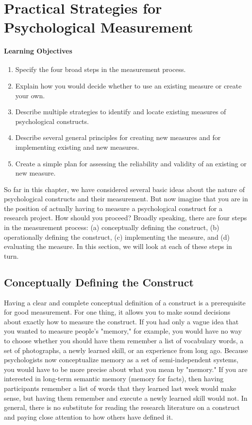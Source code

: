 \newpage
\section{Practical Strategies for Psychological Measurement}


 \paragraph{Learning Objectives}
 \begin{enumerate}
 \item Specify the four broad steps in the measurement process.
 \item Explain how you would decide whether to use an existing measure or create your own.
 \item Describe multiple strategies to identify and locate existing measures of psychological constructs.
 \item Describe several general principles for creating new measures and for implementing existing and new measures.
 \item Create a simple plan for assessing the reliability and validity of an existing or new measure.
  \end{enumerate}


So far in this chapter, we have considered several basic ideas about the nature of psychological constructs and their measurement. But now imagine that you are in the position of actually having to measure a psychological construct for a research project. How should you proceed? Broadly speaking, there are four steps in the measurement process: (a) conceptually defining the construct, (b) operationally defining the construct, (c) implementing the measure, and (d) evaluating the measure. In this section, we will look at each of these steps in turn.

\subsection{Conceptually Defining the Construct}

Having a clear and complete conceptual definition of a construct is a prerequisite for good measurement. For one thing, it allows you to make sound decisions about exactly how to measure the construct. If you had only a vague idea that you wanted to measure people's "memory," for example, you would have no way to choose whether you should have them remember a list of vocabulary words, a set of photographs, a newly learned skill, or an experience from long ago. Because psychologists now conceptualize memory as a set of semi-independent systems, you would have to be more precise about what you mean by "memory." If you are interested in long-term semantic memory (memory for facts), then having participants remember a list of words that they learned last week would make sense, but having them remember and execute a newly learned skill would not. In general, there is no substitute for reading the research literature on a construct and paying close attention to how others have defined it.

